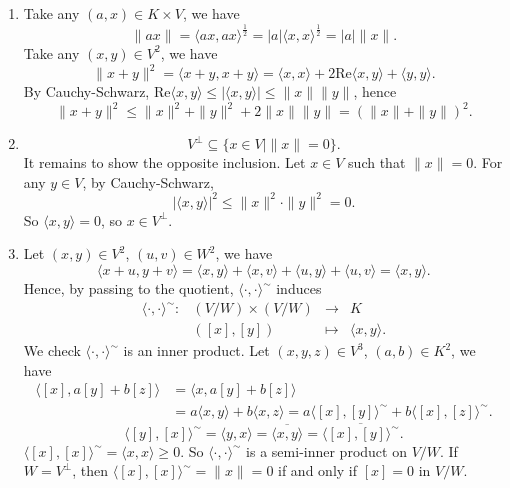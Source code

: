 \begin{proofenv}
    \quad 
    \begin{enumerate}
        \item Take any $(a,x) \in K\times V$, we have 
        $$\| ax\| = \langle ax, ax\rangle^{\frac{1}{2}} = |a| \langle x,x\rangle^{\frac{1}{2}} = |a|\|x\|.$$
        Take any $(x,y)\in V^2$, we have 
        $$ \| x+y\|^2 = \langle x+y,x+y\rangle = \langle x,x\rangle + 2\mathrm{Re}\langle x, y\rangle + \langle y, y\rangle.$$
        By Cauchy-Schwarz, $\mathrm{Re}\langle x,y\rangle \le |\langle x, y\rangle| \le \|x\|\|y\|$, hence
        $$ \| x+y \|^2 \le \| x\|^2 +\|y \|^2 + 2\|x\|\|y\| = \left(\|x\| +\|y\|\right)^2.$$
        \item $$ V^\perp \subseteq \{x \in V\mid \| x\| = 0\}.$$
        It remains to show the opposite inclusion. Let $x\in V$ such that $\| x\| = 0$. For any $y\in V$, by Cauchy-Schwarz,
        $$ |\langle x,y\rangle|^2 \le \| x\|^2 \cdot \| y\|^2 =0.$$
        So $\langle x,y\rangle =0$, so $x\in V^\perp$.
        \item Let $(x,y)\in V^2$, $(u,v)\in W^2$, we have
        $$ \langle x + u, y + v \rangle = \langle x,y\rangle + \langle x,v\rangle + \langle u,y\rangle + \langle u,v\rangle = \langle x,y\rangle.$$
        Hence, by passing to the quotient, $\langle \cdot, \cdot\rangle^\sim$ induces 
        $$\begin{array}{rrcl}
            \langle \cdot ,\cdot\rangle^\sim : & \left(V/W\right) \times \left(V/W\right) & \rightarrow & K\\
            & \left( [x], [y] \right) & \mapsto & \langle x,y\rangle.
        \end{array}$$
        We check $\langle \cdot ,\cdot\rangle^\sim$ is an inner product. Let $(x,y,z)\in V^3$, $(a,b)\in K^2$, we have
        $$ \begin{array}{rl}
            \langle [x] , a[y] + b[z]\rangle &= \langle x, a[y] + b[z]\rangle  \\
            &= a\langle x,y\rangle + b\langle x,z\rangle = a\langle [x], [y]\rangle^\sim + b\langle [x], [z]\rangle^\sim.
        \end{array}$$
        $$ \langle [y],[x] \rangle^\sim = \langle y,x\rangle = \overline{\langle x,y\rangle} = \overline{\langle [x], [y]\rangle^\sim}.$$
        $ \langle [x], [x]\rangle^\sim = \langle x,x\rangle \ge0.$ So $\langle \cdot, \cdot\rangle^\sim$ is a semi-inner product on $V/W$.
        If $W = V^\perp$, then $\langle [x], [x]\rangle^\sim = \| x\| = 0$ if and only if $[x]=0$ in $V/W$.
    \end{enumerate}
\end{proofenv}
